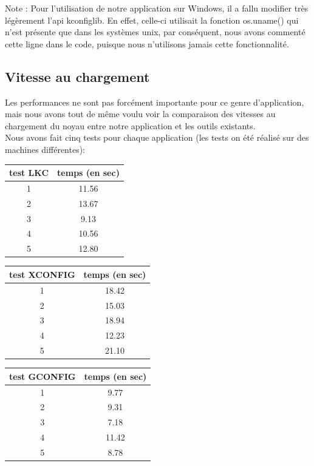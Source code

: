 \documentclass[17pts]{report}
\begin{document}
Note : Pour l'utilisation de notre application sur Windows, il a fallu modifier
très légèrement l'api kconfiglib. En effet, celle-ci utilisait la fonction
os.uname() qui n'est présente que dans les systèmes unix, par conséquent, nous
avons commenté cette ligne dans le code, puisque nous n'utilisons jamais cette
fonctionnalité.

\subsection{Vitesse au chargement}

Les performances ne sont pas forcément importante pour ce genre d'application,
mais nous avons tout de même voulu voir la comparaison des vitesses au
chargement du noyau entre notre application et les outils existants.\\

Nous avons fait cinq tests pour chaque application (les tests on été réalisé
sur des machines différentes):

\begin{tabular}{|c|c|}
\hline
test LKC & temps (en sec) \\
\hline
\hline
1 & 11.56 \\
\hline
2 & 13.67 \\
\hline
3 & 9.13 \\
\hline
4 & 10.56 \\
\hline
5 & 12.80 \\
\hline
\end{tabular}
\newline
\newline

\begin{tabular}{|c|c|}
\hline
test XCONFIG & temps (en sec) \\
\hline
\hline
1 & 18.42 \\
\hline
2 & 15.03 \\
\hline
3 & 18.94 \\
\hline
4 & 12.23 \\
\hline
5 & 21.10 \\
\hline
\end{tabular}
\newline
\newline

\begin{tabular}{|c|c|}
\hline
test GCONFIG & temps (en sec) \\
\hline
\hline
1 & 9.77 \\
\hline
2 & 9.31 \\
\hline
3 & 7.18 \\
\hline
4 & 11.42 \\
\hline
5 & 8.78 \\
\hline
\end{tabular}
\end{document}
